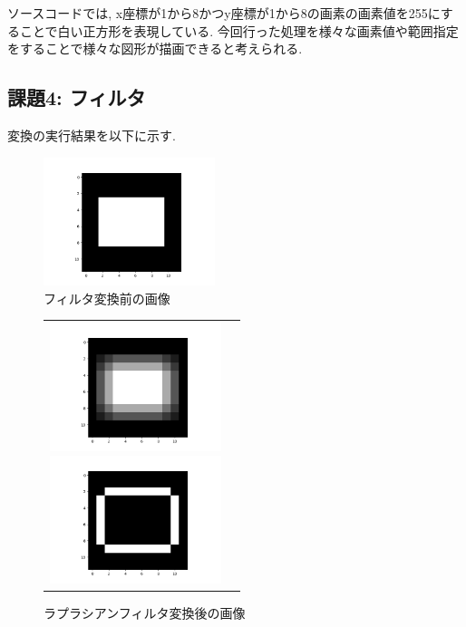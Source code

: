 \documentclass[a4paper,11pt,uplatex, titlepage]{jsarticle}
\begin{document}
ソースコードでは, x座標が1から8かつy座標が1から8の画素の画素値を255にすることで白い正方形を表現している.
今回行った処理を様々な画素値や範囲指定をすることで様々な図形が描画できると考えられる.

\subsection{課題4: フィルタ}
変換の実行結果を以下に示す.

\begin{figure}[H]
  \begin{center}
    \includegraphics[width = 5cm]{pic/kadai4.png}
    \caption{フィルタ変換前の画像}
    \label{beforefilter}
  \end{center}
\end{figure}

\begin{figure}[H]
  \begin{tabular}{cc}
    \begin{minipage}{0.5\hsize}
      \begin{center}
        \includegraphics[width = 5cm]{pic/kadai4_1.png}
        \caption{移動平均フィルタ変換後の画像}
        \label{meanfilter}
      \end{center}
    \end{minipage}

    \begin{minipage}{0.5\hsize}
      \begin{center}
        \includegraphics[width = 5cm]{pic/kadai4_raplace.png}
        \caption{ラプラシアンフィルタ変換後の画像}
        \label{raplacefilter}
      \end{center}
    \end{minipage}
  \end{tabular}
\end{figure}
\end{document}
